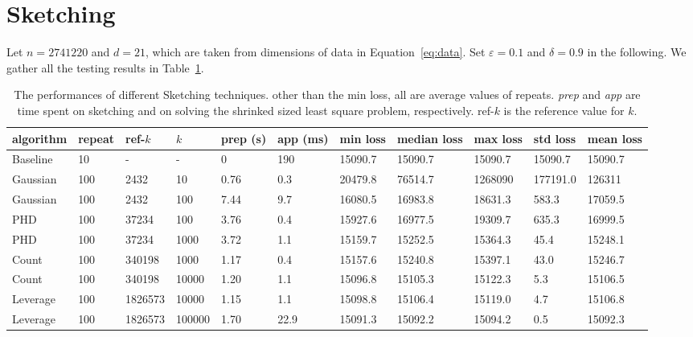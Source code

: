 \section{Sketching}

Let $n=2741220$ and $d=21$, which are taken
from dimensions of data in Equation~\eqref{eq:data}.
Set $\varepsilon=0.1$ and $\delta=0.9$ in the following.
We gather all the testing results in Table~\ref{tab:grand}.

\begin{table}[htb]
  \setlength{\tabcolsep}{2.6pt}
  \caption{The performances of different Sketching techniques.
    other than the min loss, all are average values of repeats.
    \emph{prep} and \emph{app} are time spent on sketching and
    on solving the shrinked sized least square problem, respectively.
    ref-$k$ is the reference value for $k$.}
  \label{tab:grand}
  \centering
  {\small
  \begin{tabular}{lllllllllll}
    \toprule
    algorithm & repeat & ref-$k$ & $k$ & prep (s) & app (ms) & min loss & median loss & max loss & std loss & mean loss \\
    \midrule
    Baseline & 10 & - & - & 0 & 190 & 15090.7 & 15090.7 & 15090.7 & 15090.7 & 15090.7 \\
    Gaussian & 100 & 2432 & 10 & 0.76 & 0.3 & 20479.8 & 76514.7 & 1268090 & 177191.0 & 126311 \\
    Gaussian & 100 & 2432 & 100 & 7.44 & 9.7 & 16080.5 & 16983.8 & 18631.3 & 583.3 & 17059.5 \\
    PHD & 100 & 37234 & 100 & 3.76 & 0.4 & 15927.6 & 16977.5 & 19309.7 & 635.3 & 16999.5 \\
    PHD & 100 & 37234 & 1000 & 3.72 & 1.1 & 15159.7 & 15252.5 & 15364.3 & 45.4 & 15248.1 \\
    Count & 100 & 340198 & 1000 & 1.17 & 0.4 & 15157.6 & 15240.8 & 15397.1 & 43.0 & 15246.7 \\
    Count & 100 & 340198 & 10000 & 1.20 & 1.1 & 15096.8 & 15105.3 & 15122.3 & 5.3 & 15106.5 \\
    Leverage & 100 & 1826573 & 10000 & 1.15 & 1.1 & 15098.8 & 15106.4 & 15119.0 & 4.7 & 15106.8 \\
    Leverage & 100 & 1826573 & 100000 & 1.70 & 22.9 & 15091.3 & 15092.2 & 15094.2 & 0.5 & 15092.3 \\
    \bottomrule
  \end{tabular}
  }
\end{table}

%
